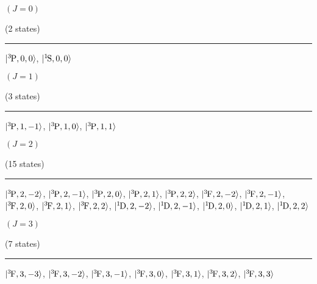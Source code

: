 \begin{mdframed}
\begin{center}
$(J=0)$

(2 states)
\vspace{0.25cm}
\hrule
\vspace{0.25cm}
$|{}^{3}{\kern-0.1em}{\text{P}},0,0\rangle$, $|{}^{1}{\kern-0.1em}{\text{S}},0,0\rangle$
\end{center}
\end{mdframed}

\begin{mdframed}
\begin{center}
$(J=1)$

(3 states)
\vspace{0.25cm}
\hrule
\vspace{0.25cm}
$|{}^{3}{\kern-0.1em}{\text{P}},1,-1\rangle$, $|{}^{3}{\kern-0.1em}{\text{P}},1,0\rangle$, $|{}^{3}{\kern-0.1em}{\text{P}},1,1\rangle$
\end{center}
\end{mdframed}

\begin{mdframed}
\begin{center}
$(J=2)$

(15 states)
\vspace{0.25cm}
\hrule
\vspace{0.25cm}
$|{}^{3}{\kern-0.1em}{\text{P}},2,-2\rangle$, $|{}^{3}{\kern-0.1em}{\text{P}},2,-1\rangle$, $|{}^{3}{\kern-0.1em}{\text{P}},2,0\rangle$, $|{}^{3}{\kern-0.1em}{\text{P}},2,1\rangle$, $|{}^{3}{\kern-0.1em}{\text{P}},2,2\rangle$, $|{}^{3}{\kern-0.1em}{\text{F}},2,-2\rangle$, $|{}^{3}{\kern-0.1em}{\text{F}},2,-1\rangle$, $|{}^{3}{\kern-0.1em}{\text{F}},2,0\rangle$, $|{}^{3}{\kern-0.1em}{\text{F}},2,1\rangle$, $|{}^{3}{\kern-0.1em}{\text{F}},2,2\rangle$, $|{}^{1}{\kern-0.1em}{\text{D}},2,-2\rangle$, $|{}^{1}{\kern-0.1em}{\text{D}},2,-1\rangle$, $|{}^{1}{\kern-0.1em}{\text{D}},2,0\rangle$, $|{}^{1}{\kern-0.1em}{\text{D}},2,1\rangle$, $|{}^{1}{\kern-0.1em}{\text{D}},2,2\rangle$
\end{center}
\end{mdframed}

\begin{mdframed}
\begin{center}
$(J=3)$

(7 states)
\vspace{0.25cm}
\hrule
\vspace{0.25cm}
$|{}^{3}{\kern-0.1em}{\text{F}},3,-3\rangle$, $|{}^{3}{\kern-0.1em}{\text{F}},3,-2\rangle$, $|{}^{3}{\kern-0.1em}{\text{F}},3,-1\rangle$, $|{}^{3}{\kern-0.1em}{\text{F}},3,0\rangle$, $|{}^{3}{\kern-0.1em}{\text{F}},3,1\rangle$, $|{}^{3}{\kern-0.1em}{\text{F}},3,2\rangle$, $|{}^{3}{\kern-0.1em}{\text{F}},3,3\rangle$
\end{center}
\end{mdframed}

